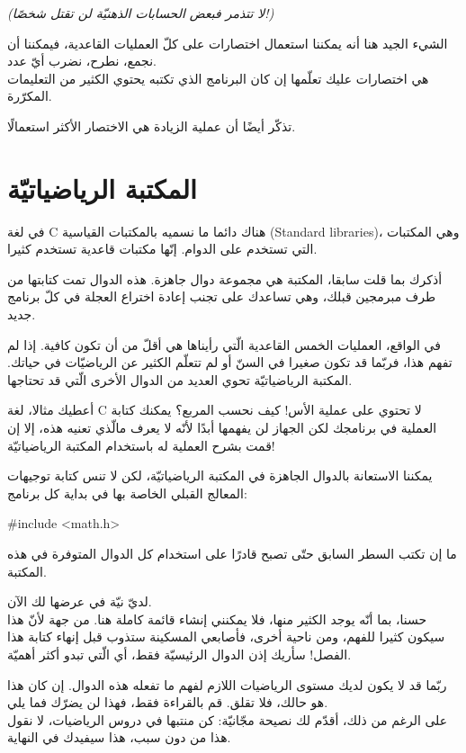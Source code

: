 \textit{(لا تتذمر فبعض الحسابات الذهنيّة لن تقتل شخصًا!)}

الشيء الجيد هنا أنه يمكننا استعمال اختصارات على كلّ العمليات القاعدية، فيمكننا أن نجمع، نطرح، نضرب أيّ عدد.\\
هي اختصارات عليك تعلّمها إن كان البرنامج الذي تكتبه يحتوي الكثير من التعليمات المكرّرة.

تذكّر أيضًا أن عملية الزيادة هي الاختصار الأكثر استعمالًا.

\section{المكتبة الرياضياتيّة}

في لغة \textenglish{C}
هناك دائما ما نسميه بالمكتبات القياسية
(\textenglish{Standard libraries})،
 وهي المكتبات التي تستخدم على الدوام. إنّها مكتبات قاعدية تستخدم كثيرا.

أذكرك بما قلت سابقا، المكتبة هي مجموعة دوال جاهزة. هذه الدوال تمت كتابتها من طرف مبرمجين قبلك، وهي تساعدك على تجنب إعادة اختراع العجلة في كلّ برنامج جديد.

في الواقع، العمليات الخمس القاعدية الّتي رأيناها هي أقلّ من أن تكون كافية. إذا لم تفهم هذا، فربّما قد تكون صغيرا في السنّ أو لم تتعلّم الكثير عن الرياضيّات في حياتك. المكتبة الرياضياتيّة تحوي العديد من الدوال الأخرى الّتي قد تحتاجها.


أعطيك مثالا، لغة \textenglish{C}
لا تحتوي على عملية الأس! كيف نحسب المربع؟ يمكنك كتابة العملية
في برنامجك لكن الجهاز لن يفهمها أبدًا لأنّه لا يعرف مالّذي تعنيه هذه، إلا إن قمت بشرح العملية له باستخدام المكتبة الرياضياتيّة!

يمكننا الاستعانة بالدوال الجاهزة في المكتبة الرياضياتيّة، لكن لا تنس كتابة توجيهات المعالج القبلي الخاصة بها في بداية كل برنامج:

\begin{Csource}
#include <math.h>
\end{Csource}

ما إن تكتب السطر السابق حتّى تصبح قادرًا على استخدام كل الدوال المتوفرة في هذه المكتبة.

لديّ نيّة في عرضها لك الآن.\\
حسنا، بما أنّه يوجد الكثير منها، فلا يمكنني إنشاء قائمة كاملة هنا. من جهة لأنّ هذا سيكون كثيرا للفهم، ومن ناحية أخرى، فأصابعي  المسكينة ستذوب قبل إنهاء كتابة هذا الفصل! سأريك إذن الدوال الرئيسيّة فقط، أي الّتي تبدو أكثر أهميّة.

\begin{information}
ربّما قد لا يكون لديك مستوى  الرياضيات اللازم لفهم ما تفعله هذه الدوال. إن كان هذا هو حالك، فلا تقلق. قم بالقراءة فقط، فهذا لن يضرّك فما يلي.\\
على الرغم من ذلك، أقدّم لك نصيحة مجّانيّة: كن منتبها في دروس الرياضيات، لا نقول هذا من دون سبب، هذا سيفيدك في النهاية.
\end{information}

